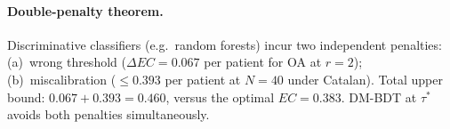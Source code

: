 \documentclass[ba,preprint]{imsart}
\theoremstyle{plain}
\theoremstyle{remark}
\begin{document}
\paragraph{Double-penalty theorem.}
Discriminative classifiers (e.g.\ random forests) incur two independent penalties:
(a)~wrong threshold ($\Delta EC = 0.067$ per patient for OA at $r=2$);
(b)~miscalibration ($\leq 0.393$ per patient at $N=40$ under Catalan).
Total upper bound: $0.067 + 0.393 = 0.460$, versus the optimal $EC = 0.383$.
DM-BDT at $\tau^*$ avoids both penalties simultaneously.



\end{document}

